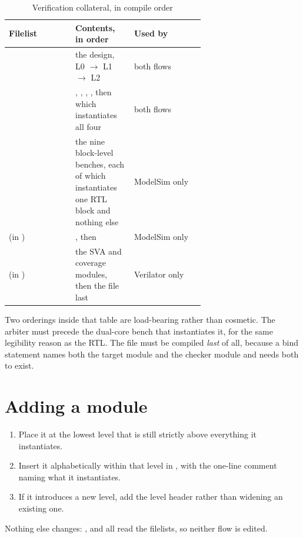 \begin{table}[H]
\centering
\caption{Verification collateral, in compile order}
\label{tab:tblevels}
\begin{tabular}{@{}lL{0.30\linewidth}L{0.36\linewidth}@{}}
\toprule
\textbf{Filelist} & \textbf{Contents, in order} & \textbf{Used by} \\
\midrule
{} & the design, L0 $\rightarrow$ L1 $\rightarrow$ L2 &
  both flows \\
 & , ,
  , , then 
  which instantiates all four & both flows \\
 & the nine block-level benches, each of which
  instantiates one RTL block and nothing else & ModelSim only \\
(in ) & , then  &
  ModelSim only \\
(in ) & the SVA and coverage modules, then the
   file last & Verilator only \\
\bottomrule
\end{tabular}
\end{table}

Two orderings inside that table are load-bearing rather than cosmetic. The
arbiter must precede the dual-core bench that instantiates it, for the same
legibility reason as the RTL. The  file must be compiled
\emph{last} of all, because a bind statement names both the target module and
the checker module and needs both to exist.

\section{Adding a module}

\begin{enumerate}[leftmargin=*,itemsep=2pt]
\item Place it at the lowest level that is still strictly above everything it
instantiates.
\item Insert it alphabetically within that level in , with the
one-line comment naming what it instantiates.
\item If it introduces a new level, add the level header rather than widening
an existing one.
\end{enumerate}

Nothing else changes: ,  and
 all read the filelists, so neither flow is edited.

